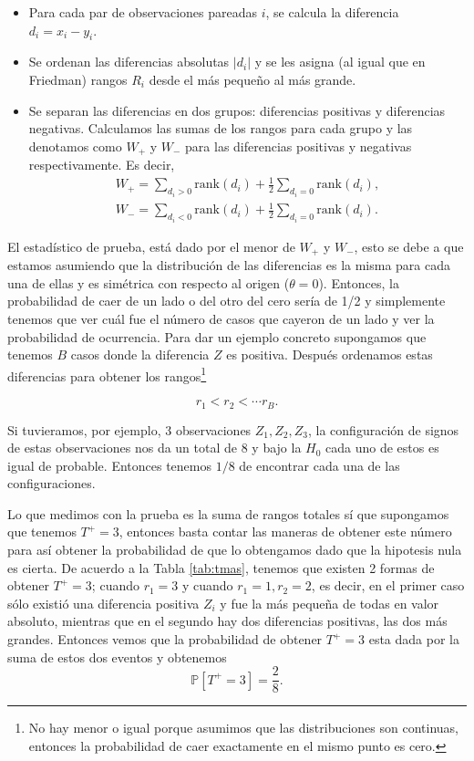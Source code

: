 \begin{itemize}
    \item Para cada par de observaciones pareadas \(i\), se calcula la diferencia \(d_i = x_i - y_i\).
    \item Se ordenan las diferencias absolutas \(|d_i|\) y se les asigna (al igual que en Friedman) rangos \(R_i\) desde el más pequeño al más grande. 
    \item Se separan las diferencias en dos grupos: diferencias positivas y diferencias negativas. Calculamos las sumas de los rangos para cada grupo  y las denotamos como \(W_+\) y \(W_-\) para las diferencias positivas y negativas respectivamente. Es decir, 
    \begin{align*}
    W_+= \sum_{d_i>0} \text{rank}(d_i) +\frac{1}{2}\sum_{d_i=0}\text{rank}(d_i), \nonumber\\
    W_-= \sum_{d_i<0} \text{rank}(d_i) +\frac{1}{2}\sum_{d_i=0}\text{rank}(d_i). \nonumber
    \end{align*}
\end{itemize}

El estadístico de prueba, está dado por el menor de \(W_+\) y \(W_-\), esto se debe a que estamos asumiendo que la distribución de las diferencias es la misma para cada una de ellas y es simétrica con respecto al origen ($\theta=0$). Entonces, la probabilidad de caer de un lado o del otro del cero sería de 1/2 y simplemente tenemos que ver cuál fue el número de casos que cayeron de un lado y ver la probabilidad de ocurrencia. Para dar un ejemplo concreto supongamos que tenemos $B$ casos donde la diferencia $Z$ es positiva. Después ordenamos estas diferencias para obtener los rangos\footnote{No hay menor o igual porque asumimos que las distribuciones son continuas, entonces la probabilidad de caer exactamente en el mismo punto es cero.} 

$$r_1 < r_2 <\cdots r_B.$$

Si tuvieramos, por ejemplo, 3 observaciones $Z_1,Z_2,Z_3$, la configuración de signos de estas observaciones nos da un total de 8 y bajo la $H_0$ cada uno de estos es igual de probable. Entonces tenemos $1/8$ de encontrar cada una de las configuraciones.

Lo que medimos con la prueba es la suma de rangos totales sí que supongamos que tenemos $T^+=3$, entonces basta contar las maneras de obtener este número para así obtener la probabilidad de que lo obtengamos dado que la hipotesis nula es cierta. De acuerdo a la Tabla \ref{tab:tmas}, tenemos que existen 2 formas de obtener $T^+=3$; cuando $r_1=3$ y cuando $r_1=1,r_2=2$, es decir, en el primer caso sólo existió una diferencia positiva $Z_i$ y fue la más pequeña de todas en valor absoluto, mientras que en el segundo hay dos diferencias positivas, las dos más grandes. Entonces vemos que la probabilidad de obtener $T^+=3$ esta dada por la suma de estos dos eventos y obtenemos $$ \mathbb{P}\left[ T^+=3 \right] =\frac{2}{8}.$$



